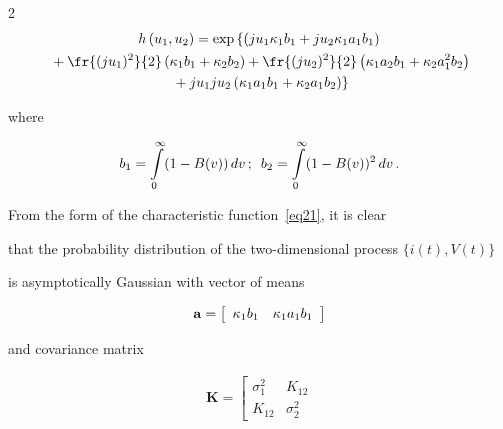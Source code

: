 \begin{multicols}{2}
\begin{multline}
h\left(u_1,u_2\right)= 


\exp\left\{ \left(ju_1\kappa_1b_1+ju_2\kappa_1a_1b_1\right)\right.\\


{}+


\fr{(ju_1)^2}{2}\left(\kappa_1b_1


+\kappa_2b_2\right)


+\fr{(ju_2)^2}{2}\left(\kappa_1a_2b_1+\kappa_2a_1^2b_2\right)\\


\left.{}+


ju_1ju_2\left(\kappa_1a_1b_1+\kappa_2a_1b_2\right)\right\}


\label{eq21}


\end{multline}


where 


$$


b_1=\int\limits_0^{\infty}(1-B(v))\,dv\,;\enskip  


b_2=\int\limits_0^{\infty}(1-B(v))^2\,dv\,.


$$








From the form of the characteristic function~\eqref{eq21}, it is clear 


that the probability distribution of the two-dimensional process $\{i(t),V(t)\}$ 


is asymptotically Gaussian with vector of means


$$


{\bf a}=\left[


\begin{array}{lr}


\kappa_1b_1 &  \kappa_1a_1b_1


\end{array}


\right]


$$


and covariance matrix


\begin{multline*}


\mathbf{K}=\left[


\begin{array}{cc}


\sigma_1^2 &  K_{12} \\


K_{12} & \sigma_2^2


\end{array}



\end{multline*}
\end{multicols}
